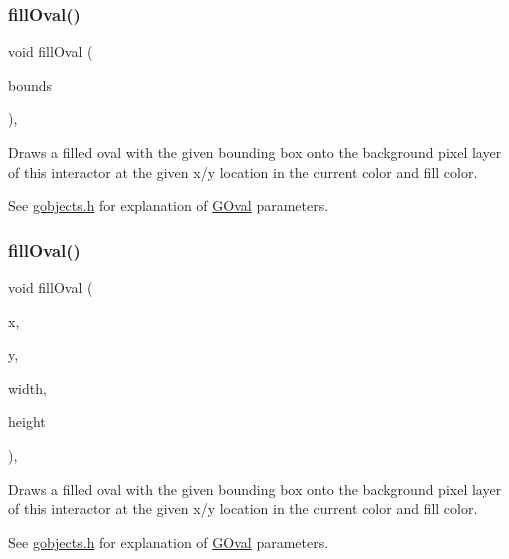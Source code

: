 \subsubsection{\texorpdfstring{fill\+Oval()}{fillOval()}\hspace{0.1cm}{\footnotesize\ttfamily [1/2]}}
{\footnotesize\ttfamily void fill\+Oval (\begin{DoxyParamCaption}\item[{const \mbox{\hyperlink{classGRectangle}{G\+Rectangle}} \&}]{bounds }\end{DoxyParamCaption})\hspace{0.3cm}{\ttfamily [virtual]}, {\ttfamily [inherited]}}



Draws a filled oval with the given bounding box onto the background pixel layer of this interactor at the given x/y location in the current color and fill color. 

See \mbox{\hyperlink{gobjects_8h_source}{gobjects.\+h}} for explanation of \mbox{\hyperlink{classGOval}{G\+Oval}} parameters. \mbox{\label{classGDrawingSurface_a28c700c82f31cd328a4629273420ee61}} 
\subsubsection{\texorpdfstring{fill\+Oval()}{fillOval()}\hspace{0.1cm}{\footnotesize\ttfamily [2/2]}}
{\footnotesize\ttfamily void fill\+Oval (\begin{DoxyParamCaption}\item[{double}]{x,  }\item[{double}]{y,  }\item[{double}]{width,  }\item[{double}]{height }\end{DoxyParamCaption})\hspace{0.3cm}{\ttfamily [virtual]}, {\ttfamily [inherited]}}



Draws a filled oval with the given bounding box onto the background pixel layer of this interactor at the given x/y location in the current color and fill color. 

See \mbox{\hyperlink{gobjects_8h_source}{gobjects.\+h}} for explanation of \mbox{\hyperlink{classGOval}{G\+Oval}} parameters. \mbox{\label{classGDrawingSurface_a15f8c1c4409ef51c1a30a92a195b8f66}} 
